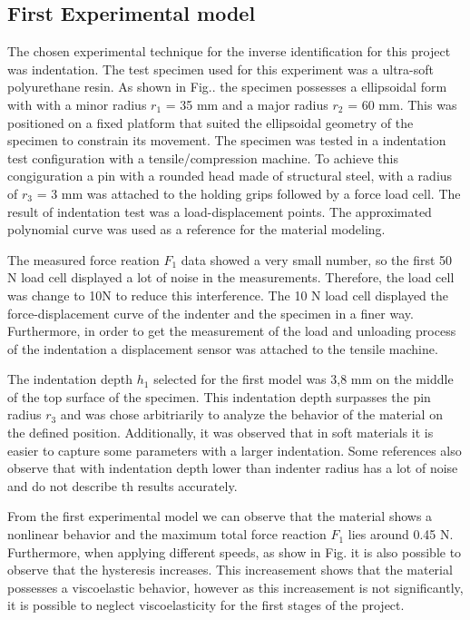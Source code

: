 \subsection{First Experimental model}
The chosen experimental technique for the inverse identification for this project was indentation. 
The test specimen used for this experiment was a ultra-soft polyurethane resin. 
As shown in Fig.. the specimen possesses a ellipsoidal form with 
with a minor radius \(r_1\) = 35 mm and a major radius \(r_2\) = 60 mm. This was positioned
 on a fixed platform that suited the ellipsoidal geometry of the 
 specimen to constrain its movement. 
 The specimen was tested in a indentation test configuration with a tensile/compression machine.
 To achieve this congiguration a pin with a rounded head made of structural steel, 
 with a radius of \(r_3\) = 3 mm was attached 
 to the holding grips followed by a force load cell. 
The result of indentation test was a load-displacement points. The approximated 
polynomial curve was used as a reference for the material modeling.


 The measured force reation \(F_1\) data showed a very small number, so the 
 first 50 N load cell displayed a lot of noise in the measurements. 
 Therefore, the load cell was change to 10N to reduce this interference. 
The 10 N load cell displayed the force-displacement curve of the indenter and the specimen
 in a finer way. Furthermore, in order to get the measurement of the load and 
 unloading process of
 the indentation a displacement sensor was attached to the tensile machine.

 The indentation depth \(h_1\) selected for the first model was 3,8 mm on the middle of the 
 top surface of the specimen. This indentation depth surpasses the pin radius \(r_3\) and 
 was chose arbitriarily to analyze the behavior of the material on the defined position.
 Additionally, it was observed that in soft materials it is easier to capture 
 some parameters with a larger indentation. Some references also observe that with
 indentation depth lower than indenter radius has a lot of noise and do not describe
 th results accurately. %

 From the first experimental model we can observe that the material shows a nonlinear 
 behavior and the maximum total force reaction \(F_1\) lies around 0.45 N. %
 Furthermore, when applying different speeds, as show in Fig. %
 it is also possible to observe that 
 the hysteresis increases. %
This increasement shows that the material possesses a viscoelastic behavior, however
as this increasement is not significantly, it is possible to neglect viscoelasticity for 
the first stages of the project.

